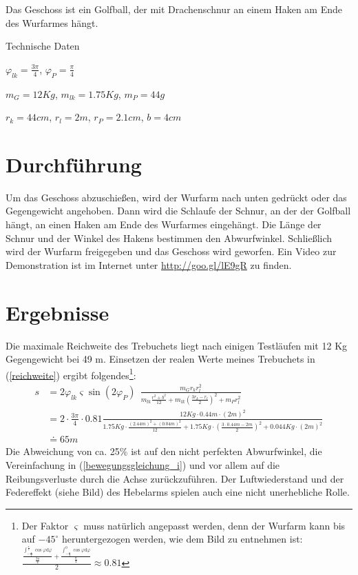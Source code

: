 Das Geschoss ist ein Golfball, der mit Drachenschnur an einem Haken am Ende des Wurfarmes hängt.

\begin{framed}
Technische Daten

$\varphi_{lk}=\frac{3\pi}{4}$, 
$\varphi_P=\frac{\pi}{4}$

$m_G=12\unit{Kg}$, 
$m_{lk}=1.75\unit{Kg}$, 
$m_P=44\unit{g}$

$r_k=44\unit{cm}$, 
$r_l=2\unit{m}$,
$r_P=2.1\unit{cm}$, 
$b=4\unit{cm}$
\end{framed}

\section{Durchführung}
Um das Geschoss abzuschießen, wird der Wurfarm nach unten gedrückt oder das Gegengewicht angehoben. Dann wird die Schlaufe der Schnur, an der der Golfball hängt, an einen Haken am Ende des Wurfarmes eingehängt. Die Länge der Schnur und der Winkel des Hakens bestimmen den Abwurfwinkel. Schließlich wird der Wurfarm freigegeben und das Geschoss wird geworfen. Ein Video zur Demonstration ist im Internet unter \url{http://goo.gl/lE9gR} zu finden.





\section{Ergebnisse}
Die maximale Reichweite des Trebuchets liegt nach einigen Testläufen mit 12 Kg Gegengewicht bei 49 m. Einsetzen der realen Werte meines Trebuchets in (\ref{reichweite}) ergibt folgendes\footnote{Der Faktor $\varsigma$ muss natürlich angepasst werden, denn der Wurfarm kann bis auf $-45^\circ$ heruntergezogen werden, wie dem Bild zu entnehmen ist: 
$\frac{ \frac{
 		\int_
 			{-\frac{\pi}{4}} ^\frac{\pi}{2} 
 			\cos{\varphi}\mathrm d\varphi}{
 			\frac{3\pi}{4}
 		} +
 		 \frac{
 		\int_
 			{-\frac{\pi}{4}} ^0
 			\cos{\varphi}\mathrm d\varphi
 		}{
 			\frac{\pi}{4}
 		}}{2}\approx 0.81 $
}:
\begin{align*}
s &= 2 \varphi_{lk} \varsigma \sin{(2\varphi_P)} \ \ \frac{ m_G  r_kr_l^2}
		{m_{lk} \frac{r^2+b^2}{12} + m_{lk} (\frac{3r_k-r_l}{2})^2+m_P r_l^2}\\
		&=2\cdot \frac{3\pi}{4} \cdot 0.81 \frac{ 12\unit{Kg}\cdot 0.44\unit{m}\cdot (2\unit{m})^2}
		{1.75\unit{Kg} \cdot\frac{(2.44\unit{m})^2+(0.04\unit{m})^2}{12} + 1.75\unit{Kg} \cdot(\frac{3\cdot0.44\unit{m}-2\unit{m}}{2})^2+0.044\unit{Kg} \cdot(2\unit{m})^2}\\
		&\doteq 65 \unit{m}
\end{align*}
Die Abweichung von ca. 25\% ist auf den nicht perfekten Abwurfwinkel, die Vereinfachung in (\ref{bewegungsgleichung_i}) und vor allem auf die Reibungsverluste durch die Achse zurückzuführen. Der Luftwiederstand und der Federeffekt (siehe Bild) des Hebelarms spielen auch eine nicht unerhebliche Rolle.

